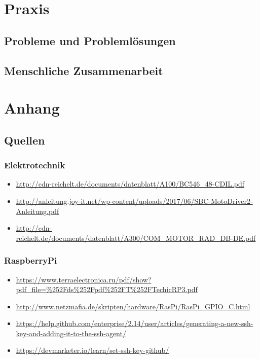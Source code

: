 \documentclass{report}
\begin{document}
\chapter{Praxis}

\section{Probleme und Problemlösungen}

\section{Menschliche Zusammenarbeit}

\chapter{Anhang}
\section{Quellen}

\subsection{Elektrotechnik}
\begin{itemize}

\item \url{http://cdn-reichelt.de/documents/datenblatt/A100/BC546_48-CDIL.pdf}


\item \url{http://anleitung.joy-it.net/wp-content/uploads/2017/06/SBC-MotoDriver2-Anleitung.pdf}

\item \url{http://cdn-reichelt.de/documents/datenblatt/A300/COM_MOTOR_RAD_DB-DE.pdf}

\end{itemize}

\subsection{RaspberryPi}

\begin{itemize}

\item \url{https://www.terraelectronica.ru/pdf/show?pdf_file=%252Fds%252Fpdf%252FT%252FTechicRP3.pdf}

\item \url{http://www.netzmafia.de/skripten/hardware/RasPi/RasPi_GPIO_C.html}

\item \url{https://help.github.com/enterprise/2.14/user/articles/generating-a-new-ssh-key-and-adding-it-to-the-ssh-agent/}

\item \url{https://devmarketer.io/learn/set-ssh-key-github/}

\end{itemize}
\end{document}
